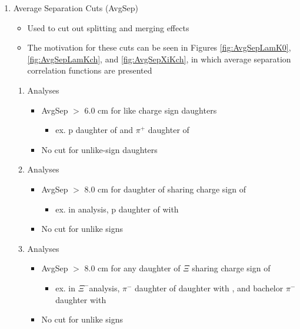 \documentclass[../AnalysisNoteJBuxton.tex]{subfiles}
\begin{document}
\begin{enumerate}
 \item Average Separation Cuts (AvgSep)
 \begin{itemize}
  \item Used to cut out splitting and merging effects
  \item The motivation for these cuts can be seen in Figures \ref{fig:AvgSepLamK0}, \ref{fig:AvgSepLamKch}, and \ref{fig:AvgSepXiKch}, in which average separation correlation functions are presented
 \end{itemize}
 \begin{enumerate}
  \item \LamKs Analyses
  \begin{itemize}
   \item AvgSep $>$ 6.0 cm for like charge sign daughters
   \begin{itemize}
    \item ex. p daughter of \Lam and $\pi^{+}$ daughter of \Ks
   \end{itemize}
   \item No cut for unlike-sign daughters
  \end{itemize}
  \item \LamKpm Analyses
  \begin{itemize}
   \item AvgSep $>$ 8.0 cm for daughter of \LamALam sharing charge sign of \Kpm
   \begin{itemize}
    \item ex. in \LamKchP analysis, p daughter of \Lam with \KchP
   \end{itemize}
   \item No cut for unlike signs
  \end{itemize}
  \item \XiKpm Analyses
  \begin{itemize}
   \item AvgSep $>$ 8.0 cm for any daughter of $\Xi$ sharing charge sign of \Kpm
   \begin{itemize}
    \item ex. in $\Xi^{-}$\KchM analysis, $\pi^{-}$ daughter of \Lam daughter with \KchM, and bachelor $\pi^{-}$ daughter with \KchM
   \end{itemize}
   \item No cut for unlike signs
  \end{itemize}  
 \end{enumerate}
\end{enumerate}
\end{document}
